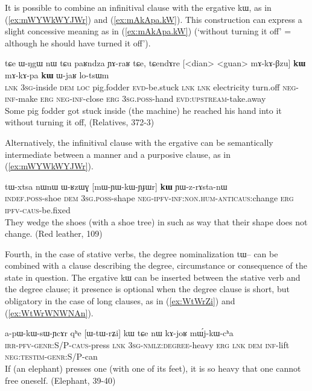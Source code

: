 \documentclass[oldfontcommands,oneside,a4paper,11pt]{article}
\newcommand{\ipa}[1]{{\phon \mbox{#1}}} %
\newcommand{\refb}[1]{(\ref{#1})}
\begin{document}
 


It is possible to combine an infinitival clause with the ergative \ipa{kɯ}, as in  \refb{ex:mWYWkWYJWr} and \refb{ex:mAkApa.kW}.  This construction can express  a slight concessive meaning as in \refb{ex:mAkApa.kW} (`without turning it off' =  although he should have turned it off').

\begin{exe}
\ex \label{ex:mAkApa.kW}
\gll
\ipa{tɕe}   	\ipa{ɯ-ŋgɯ}   	\ipa{nɯ} \ipa{tɕu}   	\ipa{paʁndza}   	\ipa{ɲɤ-raʁ}   	\ipa{tɕe,}   	\ipa{tɕendɤre}   	[<dian>   	<guan>   	\ipa{mɤ-kɤ-βzu}] 	\ipa{\textbf{kɯ}}   	\ipa{mɤ-kɤ-pa}   	\ipa{\textbf{kɯ}}   	\ipa{ɯ-jaʁ}   	\ipa{lo-tsɯm}   \\
\textsc{lnk} \textsc{3sg}-inside \textsc{dem} \textsc{loc} pig.fodder \textsc{evd}-be.stuck \textsc{lnk}
\textsc{lnk} electricity turn.off \textsc{neg-inf}-make \textsc{erg}  \textsc{neg-inf}-close \textsc{erg}  \textsc{3sg.poss}-hand \textsc{evd:upstream}-take.away \\
\glt Some pig fodder got stuck inside (the machine) he reached his hand into it without turning it off, (Relatives, 372-3)
\end{exe} 
 
Alternatively, the infinitival clause with the ergative can be semantically intermediate between a manner and a purposive clause, as in \refb{ex:mWYWkWYJWr}.

\begin{exe}
\ex \label{ex:mWYWkWYJWr}
\gll
\ipa{tɯ-xtsa}   	\ipa{nɯnɯ}   	\ipa{ɯ-ʁzɯɣ}   	[\ipa{mɯ-ɲɯ-kɯ-ɲɟɯr}]   	\ipa{\textbf{kɯ}}   	\ipa{ɲɯ-z-rɤsta-nɯ}   \\
\textsc{indef.poss}-shoe \textsc{dem} \textsc{3sg.poss}-shape \textsc{neg-ipfv-inf:non.hum-anticaus}:change \textsc{erg} \textsc{ipfv-caus}-be.fixed \\
\glt They wedge the shoes (with a shoe tree)  in such as way that their shape does not change. (Red leather, 109)
\end{exe}

Fourth, in the case of stative verbs, the degree nominalization \ipa{tɯ--} can be combined with   a   clause    describing the degree, circumstance or   consequence of the state in question. The ergative \ipa{kɯ} can be   inserted between the stative verb and the degree clause; it presence is optional when the degree clause is short, but obligatory in the case of long clauses, as in \refb{ex:WtWrZi} and \refb{ex:WtWrWNWNAn}.
 

\begin{exe}
\ex \label{ex:WtWrZi}
\gll
\ipa{a-pɯ-kɯ-sɯ-ɲcɤr}         	\ipa{qʰe}         	[\ipa{ɯ-tɯ-rʑi}]         	\ipa{kɯ}         \ipa{tɕe}         	\ipa{nɯ}         	\ipa{kɤ-joʁ}         	\ipa{mɯ́j-kɯ-cʰa}         \\
\textsc{irr-pfv-genr:S/P-caus}-press \textsc{lnk} \textsc{3sg-nmlz:degree}-heavy \textsc{erg} \textsc{lnk} \textsc{dem} \textsc{inf}-lift \textsc{neg:testim-genr:S/P}-can \\
\glt If (an elephant) presses one (with one of its feet), it is so heavy that one cannot free oneself. (Elephant, 39-40)
\end{exe}
\end{document}
